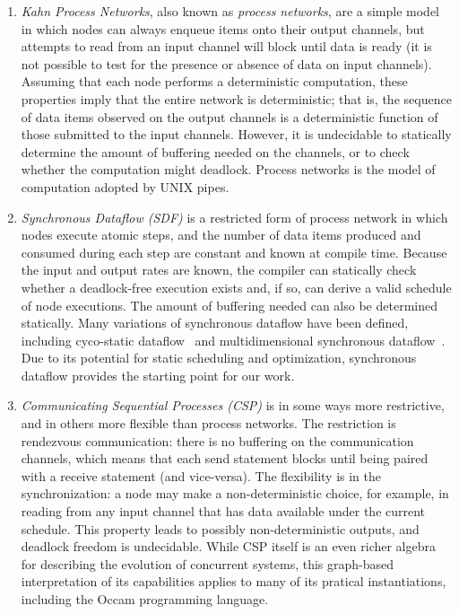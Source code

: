 \begin{enumerate}

\item {\it Kahn Process Networks}, also known as {\it process
  networks}, are a simple model in which nodes can always enqueue
  items onto their output channels, but attempts to read from an input
  channel will block until data is ready (it is not possible to test
  for the presence or absence of data on input channels).  Assuming
  that each node performs a deterministic computation, these
  properties imply that the entire network is deterministic; that is,
  the sequence of data items observed on the output channels is a
  deterministic function of those submitted to the input channels.
  However, it is undecidable to statically determine the amount of
  buffering needed on the channels, or to check whether the
  computation might deadlock.  Process networks is the model of
  computation adopted by UNIX pipes.

\item {\it Synchronous Dataflow (SDF)} is a restricted form of process
  network in which nodes execute atomic steps, and the number of data
  items produced and consumed during each step are constant and known
  at compile time.  Because the input and output rates are known, the
  compiler can statically check whether a deadlock-free execution
  exists and, if so, can derive a valid schedule of node executions.
  The amount of buffering needed can also be determined statically.
  Many variations of synchronous dataflow have been defined, including
  cyco-static
  dataflow~\cite{bilsen_cyclo-static_1995,parks_comparison_1995} and
  multidimensional synchronous
  dataflow~\cite{murthy_multidimensional_2002}.  Due to its potential
  for static scheduling and optimization, synchronous dataflow
  provides the starting point for our work.

\item {\it Communicating Sequential Processes (CSP)} is in some ways
  more restrictive, and in others more flexible than process networks.
  The restriction is rendezvous communication: there is no buffering
  on the communication channels, which means that each send statement
  blocks until being paired with a receive statement (and vice-versa).
  The flexibility is in the synchronization: a node may make a
  non-deterministic choice, for example, in reading from any input
  channel that has data available under the current schedule.  This
  property leads to possibly non-deterministic outputs, and deadlock
  freedom is undecidable.  While CSP itself is an even richer algebra
  for describing the evolution of concurrent systems, this graph-based
  interpretation of its capabilities applies to many of its pratical
  instantiations, including the Occam programming language.

\end{enumerate}

